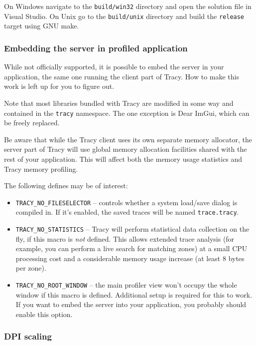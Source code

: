 \documentclass[hidelinks,titlepage,a4paper]{article}
\begin{document}
On Windows navigate to the \texttt{build/win32} directory and open the solution file in Visual Studio. On Unix go to the \texttt{build/unix} directory and build the \texttt{release} target using GNU make.

\subsubsection{Embedding the server in profiled application}
\label{embeddingserver}

While not officially supported, it is possible to embed the server in your application, the same one running the client part of Tracy. How to make this work is left up for you to figure out.

Note that most libraries bundled with Tracy are modified in some way and contained in the \texttt{tracy} namespace. The one exception is Dear ImGui, which can be freely replaced.

Be aware that while the Tracy client uses its own separate memory allocator, the server part of Tracy will use global memory allocation facilities shared with the rest of your application. This will affect both the memory usage statistics and Tracy memory profiling.

The following defines may be of interest:

\begin{itemize}
\item \texttt{TRACY\_NO\_FILESELECTOR} -- controls whether a system load/save dialog is compiled in. If it's enabled, the saved traces will be named \texttt{trace.tracy}.
\item \texttt{TRACY\_NO\_STATISTICS} -- Tracy will perform statistical data collection on the fly, if this macro is \emph{not} defined. This allows extended trace analysis (for example, you can perform a live search for matching zones) at a small CPU processing cost and a considerable memory usage increase (at least 8 bytes per zone).
\item \texttt{TRACY\_NO\_ROOT\_WINDOW} -- the main profiler view won't occupy the whole window if this macro is defined. Additional setup is required for this to work. If you want to embed the server into your application, you probably should enable this option.
\end{itemize}

\subsubsection{DPI scaling}
\end{document}
